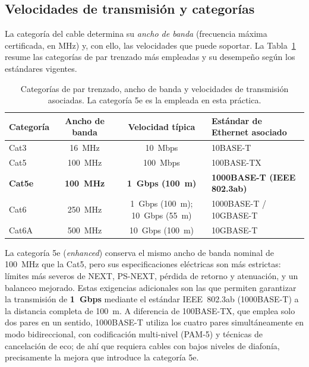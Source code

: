 \documentclass[11pt,a4paper]{article}
\begin{document}
\subsection{Velocidades de transmisión y categorías}

La categoría del cable determina su \textit{ancho de banda} (frecuencia
máxima certificada, en MHz) y, con ello, las velocidades que puede soportar.
La Tabla~\ref{tab:cat} resume las categorías de par trenzado más empleadas y
su desempeño según los estándares vigentes.

\begin{table}[htbp]
  \centering
  \small
  \begin{tabularx}{\textwidth}{l c c X}
    \toprule
    \textbf{Categoría} & \textbf{Ancho de banda} & \textbf{Velocidad típica} & \textbf{Estándar de Ethernet asociado} \\
    \midrule
    Cat3  & 16~MHz  & 10~Mbps                     & 10BASE-T \\
    Cat5  & 100~MHz & 100~Mbps                    & 100BASE-TX \\
    \textbf{Cat5e} & \textbf{100~MHz} & \textbf{1~Gbps (100~m)} & \textbf{1000BASE-T (IEEE 802.3ab)} \\
    Cat6  & 250~MHz & 1~Gbps (100~m); 10~Gbps (55~m) & 1000BASE-T / 10GBASE-T \\
    Cat6A & 500~MHz & 10~Gbps (100~m)             & 10GBASE-T \\
    \bottomrule
  \end{tabularx}
  \caption{Categorías de par trenzado, ancho de banda y velocidades de
  transmisión asociadas. La categoría 5e es la empleada en esta práctica.}
  \label{tab:cat}
\end{table}

La categoría 5e (\textit{enhanced}) conserva el mismo ancho de banda nominal
de 100~MHz que la Cat5, pero sus especificaciones eléctricas son más
estrictas: límites más severos de NEXT, PS-NEXT, pérdida de retorno y
atenuación, y un balanceo mejorado. Estas exigencias adicionales son las que
permiten garantizar la transmisión de \textbf{1~Gbps} mediante el estándar
IEEE~802.3ab (1000BASE-T) a la distancia completa de 100~m. A diferencia de
100BASE-TX, que emplea solo dos pares en un sentido, 1000BASE-T utiliza los
cuatro pares simultáneamente en modo bidireccional, con codificación
multi-nivel (PAM-5) y técnicas de cancelación de eco; de ahí que requiera
cables con bajos niveles de diafonía, precisamente la mejora que introduce la
categoría 5e.
\end{document}
